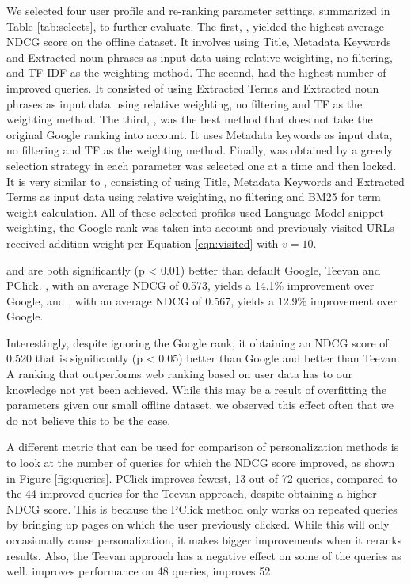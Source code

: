 \documentclass{sig-alternate}
\begin{document}
We selected four user profile and re-ranking parameter settings, summarized in Table \ref{tab:selects}, to further evaluate. The first, \MaxNDCG, yielded the highest average NDCG score on the offline dataset. It involves using Title, Metadata Keywords and Extracted noun phrases as input data using relative weighting, no filtering, and TF-IDF as the weighting method. The second, \MaxQuer had the highest number of improved queries. It consisted of using Extracted Terms and Extracted noun phrases as input data using relative weighting, no filtering and TF as the weighting method. The third, \MaxNoRank, was the best method that does not take the original Google ranking into account. It uses Metadata keywords as input data, no filtering and TF as the weighting method. Finally, \MaxBestPar was obtained by a greedy selection strategy in each parameter was selected one at a time and then locked. It is very similar to \MaxNDCG, consisting of using Title, Metadata Keywords and Extracted Terms as input data using relative weighting, no filtering and BM25 for term weight calculation. All of these selected profiles used Language Model snippet weighting, the Google rank was taken into account and previously visited URLs received addition weight per Equation \ref{eqn:visited} with $v=10$.

\MaxNDCG and \MaxQuer are both significantly (p < 0.01) better than default Google, Teevan and PClick. \MaxNDCG, with an average NDCG of 0.573, yields a 14.1\% improvement over Google, and \MaxQuer, with an average NDCG of 0.567, yields a 12.9\% improvement over Google.

Interestingly, despite \MaxNoRank ignoring the Google rank, it obtaining an NDCG score of 0.520 that is significantly (p < 0.05) better than Google and better than Teevan. A ranking that outperforms web ranking based on user data has to our knowledge not yet been achieved. While this may be a result of overfitting the parameters given our small offline dataset, we observed this effect often that we do not believe this to be the case.

A different metric that can be used for comparison of personalization methods is to look at the number of queries for which the NDCG score improved, as shown in Figure \ref{fig:queries}. PClick improves fewest, 13 out of 72 queries, compared to the 44 improved queries for the Teevan approach, despite obtaining a higher NDCG score. This is because the PClick method only works on repeated queries by bringing up pages on which the user previously clicked. While this will only occasionally cause personalization, it makes bigger improvements when it reranks results. Also, the Teevan approach has a negative effect on some of the queries as well. \MaxNDCG improves performance on 48 queries, \MaxQuer improves 52. 
\end{document}
